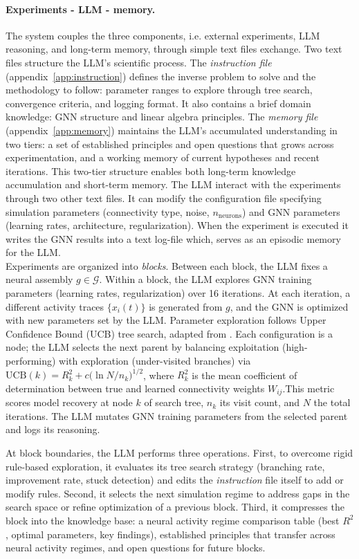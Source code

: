 \documentclass[10pt,twocolumn]{article}
\begin{document}
\paragraph{Experiments - LLM - memory.}
The system couples the three components, i.e. external experiments, LLM reasoning, and long-term memory, through simple text files exchange. Two text files structure the LLM's scientific process. The \emph{instruction file} (appendix~\ref{app:instruction}) defines the inverse problem to solve and the methodology to follow: parameter ranges to explore through tree search, convergence criteria, and logging format. It also contains a brief domain knowledge: GNN structure and linear algebra principles. The \emph{memory file} (appendix~\ref{app:memory}) maintains the LLM's accumulated understanding in two tiers: a set of established principles and open questions that grows across experimentation, and a working memory of current hypotheses and recent iterations. This two-tier structure enables both long-term knowledge accumulation and short-term memory. The LLM interact with the experiments through two other text files. It can modify the configuration file specifying simulation parameters (connectivity type, noise, $n_{\mathrm{neurons}}$) and GNN parameters (learning rates, architecture, regularization). When the experiment is executed it writes the GNN results into a text log-file which, serves as an episodic memory for the LLM.  
\\
Experiments are organized into \emph{blocks}. Between each block, the LLM fixes a neural assembly $g \in \mathcal{G}$. Within a block, the LLM explores GNN training parameters (learning rates, regularization) over 16 iterations. At each iteration, a different activity traces $\{x_i(t)\}$ is generated from $g$, and the GNN is optimized with new parameters set by the LLM. Parameter exploration follows Upper Confidence Bound (UCB) tree search, adapted from \citet{romera-paredes_mathematical_2024}. Each configuration is a node; the LLM selects the next parent by balancing exploitation (high-performing) with exploration (under-visited branches) via $\mathrm{UCB}(k) = R^2_k + c\bigl(\ln N / n_k\bigr)^{1/2}$, where $R^2_k$ is the mean coefficient of determination between true and learned connectivity weights $W_{ij}$.This metric scores model recovery at node $k$ of search tree, $n_k$ its visit count, and $N$ the total iterations. The LLM mutates GNN training parameters from the selected parent and logs its reasoning.

At block boundaries, the LLM performs three operations. First, to overcome rigid rule-based exploration, it evaluates its tree search strategy (branching rate, improvement rate, stuck detection) and edits the \emph{instruction} file itself to add or modify rules. Second, it selects the next simulation regime to address gaps in the search space or refine optimization of a previous block. Third, it compresses the block into the knowledge base: a neural activity regime comparison table (best $R^2$, optimal parameters, key findings), established principles that transfer across neural activity regimes, and open questions for future blocks.
\end{document}
